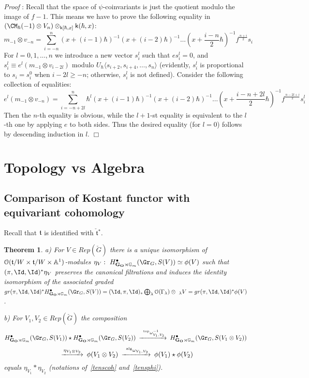 \documentclass[11pt]{amsart}
\newtheorem{thm}{Theorem}
\theoremstyle{definition}
\theoremstyle{remark}
\renewcommand{\O}{{\mathcal O}}
\theoremstyle{remark}
\newcommand{\cal}{\mathcal}
\newcommand{\<}{\langle}
\renewcommand{\>}{\rangle}
\renewcommand{\t}{{\frak t}}
\newcommand{\Lt}{\check{\mathfrak t}{}}
\newcommand{\LG}{{\check{G}}}
\renewcommand{\O}{{\cal O}}
\newcommand{\GO}{{\bf G_O}}
\newcommand{\Aone}{{\mathbb A}^1}
\newcommand{\Gm}{{{\mathbb G}_m}}
\newcommand{\kk}{\mathsf k}
\renewcommand{\proof}{{\it Proof }}
\begin{document}
\proof: Recall that the space
of $\psi$-coinvariants is just the quotient modulo the image of $f-1$.
This means we have to prove the following equality in
$(\CM_\hbar(-1)\otimes V_n)\otimes_{\kk[\hbar,x]}\kk(\hbar,x)$:
$$m_{-1}\otimes v_{-n}=\sum_{i=-n}^n%
(x+(i-1)\hbar)^{-1}(x+(i-2)\hbar)^{-1}
\ldots\left(x+\frac{i-n}{2}\hbar\right)^{-1}
f^{\frac{n+i}{2}}s_i$$
For $l=0,1,\ldots,n$ we introduce a new vector $s_i^l$ such that
$es_i^l=0$, and $s_i^l\equiv e^l(m_{-1}\otimes v_{i-2l})$ modulo
$U_\hbar\langle s_{i+2},s_{i+4},\ldots,s_{n}\rangle$ (evidently,
$s_i^l$ is proportional to $s_i=s_i^0$ 
when $i-2l\geq-n$; otherwise, $s_i^l$ is 
not defined). Consider the following collection of equalities:
$$e^l(m_{-1}\otimes v_{-n})=\sum_{i=-n+2l}^n\hbar^l%
(x+(i-1)\hbar)^{-1}(x+(i-2)\hbar)^{-1}
\ldots\left(x+\frac{i-n+2l}{2}\hbar\right)^{-1}
f^{\frac{n-2l+i}{2}}s_i^l$$
Then the $n$-th equality is obvious, while the $l+1$-st equality is equivalent
to the $l$-th one by applying $e$ to both sides. Thus the desired
equality (for $l=0$) follows by descending induction in $l$.
\hfill $\Box$



\section{Topology vs Algebra}


\subsection{Comparison of Kostant functor with equivariant cohomology}

Recall that $\t$ is identified with $\Lt^*$.

\begin{thm}
\label{compaThm}
a) For $V\in Rep(\LG)$ there is a unique isomorphism of
$\O(\t/W\times\t/W\times\Aone)$-modules
$\eta_V:\ H^\bullet_{\GO\rtimes\Gm}(\Gr_G,S(V))\simeq\phi(V)$ 
such that $(\pi,\Id,\Id)^*\eta_V$ preserves the
canonical filtrations and induces the identity isomorphism of the
associated graded 
$gr(\pi,\Id,\Id)^*H^\bullet_{\GO\rtimes\Gm}(\Gr_G,S(V))=
(\Id,\pi,\Id)_*\bigoplus_\lambda\O(\Gamma_\lambda)\otimes\ _\lambda V=
gr(\pi,\Id,\Id)^*\phi(V)$. 

b) For $V_1,V_2\in Rep(\LG)$ the composition
$$\begin{CD} 
H^\bullet_{\GO\rtimes\Gm}(\Gr_G,S(V_1))
\star H^\bullet_{\GO\rtimes\Gm}(\Gr_G,S(V_2))
@>\ ^{\operatorname{top}}\omega_{V_1,V_2}^{-1}>>
H^\bullet_{\GO\rtimes\Gm}(\Gr_G,S(V_1\otimes V_2))
\end{CD}$$
$$\begin{CD}
@>\eta_{V_1\otimes V_2}>>
\phi(V_1\otimes V_2)
@>\ ^{\operatorname{alg}}\omega_{V_1,V_2}>>
\phi(V_1)\star\phi(V_2)
\end{CD}$$ equals $\eta_{V_1}*\eta_{V_2}$ (notations  
of~\ref{tenscoh} and~\ref{tensphi}).
\end{thm}
\end{document}
